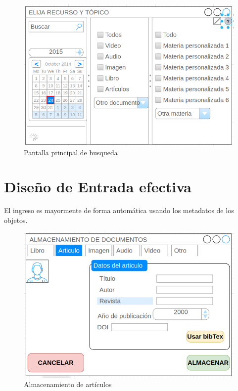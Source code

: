 \begin{figure}
	\centering
	\includegraphics[scale=0.5]{images/buscador1}
	\caption{Pantalla principal de busqueda}
\end{figure}


\section{Diseño de Entrada efectiva}
El ingreso es mayormente de forma automática usando los metadatos de los objetos. 
\begin{figure}
	\centering
	\includegraphics[scale=0.5]{images/almacenamientoDato1}
	\caption{Almacenamiento de artículos}
\end{figure}




